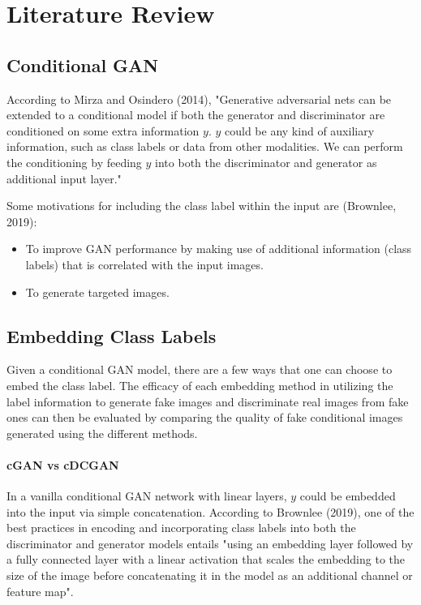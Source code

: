 \documentclass[11pt]{article}
\begin{document}
\section{Literature Review}\label{literature-review}

\subsection{Conditional GAN}\label{conditional-gan}

According to Mirza and Osindero (2014), "Generative adversarial nets can
be extended to a conditional model if both the generator and
discriminator are conditioned on some extra information \(y\). \(y\)
could be any kind of auxiliary information, such as class labels or data
from other modalities. We can perform the conditioning by feeding \(y\)
into both the discriminator and generator as additional input layer."

Some motivations for including the class label within the input are
(Brownlee, 2019):

\begin{itemize}
\item
  To improve GAN performance by making use of additional information
  (class labels) that is correlated with the input images.
\item
  To generate targeted images.
\end{itemize}

\subsection{Embedding Class Labels}\label{embedding-class-labels}

Given a conditional GAN model, there are a few ways that one can choose
to embed the class label. The efficacy of each embedding method in
utilizing the label information to generate fake images and discriminate
real images from fake ones can then be evaluated by comparing the
quality of fake conditional images generated using the different
methods.

\paragraph{cGAN vs cDCGAN}\label{cgan-vs-cdcgan}

In a vanilla conditional GAN network with linear layers, \(y\) could be
embedded into the input via simple concatenation. According to Brownlee
(2019), one of the best practices in encoding and incorporating class
labels into both the discriminator and generator models entails "using
an embedding layer followed by a fully connected layer with a linear
activation that scales the embedding to the size of the image before
concatenating it in the model as an additional channel or feature map".\\
\end{document}
